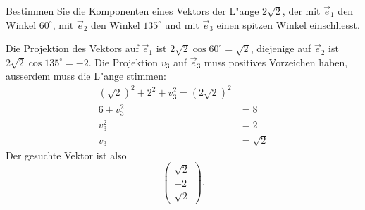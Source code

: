 Bestimmen Sie die Komponenten eines Vektors der L"ange $2\sqrt{2}$,
der mit $\vec e_1$ den Winkel $60^\circ$, mit $\vec e_2$ den Winkel
$135^\circ$ und mit $\vec e_3$ einen spitzen Winkel einschliesst.

\begin{loesung}
Die Projektion des Vektors auf $\vec e_1$ ist $2\sqrt{2}\cos 60^\circ=\sqrt{2}$,
diejenige auf $\vec e_2$ ist $2\sqrt{2}\cos135^\circ=-2$. Die Projektion $v_3$
auf $\vec e_3$ muss positives Vorzeichen haben, ausserdem muss die
L"ange stimmen:
\begin{align*}
(\sqrt{2})^2+2^2+v_3^2=(2\sqrt{2})^2\\
6+v_3^2&=8\\
v_3^2&=2\\
v_3&=\sqrt {2}
\end{align*}
Der gesuchte Vektor ist also
\[
\begin{pmatrix}\sqrt{2}\\-2\\\sqrt{2}\end{pmatrix}.
\]
\end{loesung}

